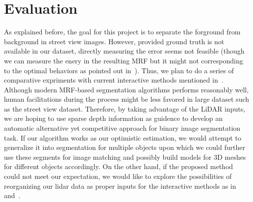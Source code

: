 \documentclass{article} %
\begin{document}
\section{Evaluation}
As explained before, the goal for this project is to separate the forground from background in street view images. However, provided ground truth is not available in our dataset, directly measuring the error seems not feasible (though we can measure the enery in the resulting MRF but it might not corresponding to the optimal behaviors as pointed out in~\citet{Szeliski2008Comparative}). Thus, we plan to do a series of comparative expriments with current interactive methods mentioned in~\citep{Szeliski2008Comparative}. Although modern MRF-based segmentation algorithms performs reasonably well, human facilitations during the process might be less favored in large dataset such as the street view dataset. Therefore,  by taking advantage of the LiDAR inputs, we are hoping to use sparse depth information as guidence to develop an automatic alternative yet competitive approach for binary image segmentation task. If our algorithm works as our optimistic estimation, we would attempt to generalize it into segmentation for multiple objects upon which we could further use these segments for image matching and possibly build models for 3D meshes for different objects accordingly. On the other hand, if the proposed method could not meet our expectation, we would like to explore the possibilities of reorganizing our lidar data as proper inputs for the interactive methods as in~\citep{Rother2004GrabCut} and~\citep{Arbelaez2011Contour}.



\end{document}
